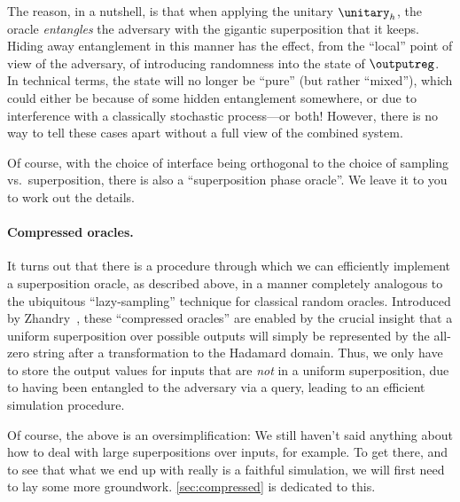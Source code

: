       The reason, in
        a nutshell, is that when applying the unitary $\unitary_h$, the oracle
        \emph{entangles} the adversary with the gigantic superposition that it
        keeps. Hiding away entanglement in this manner has the effect, from the
        ``local'' point of view of the adversary, of introducing randomness
        into the state of $\outputreg$. In technical terms, the state will no
        longer be ``pure'' (but rather ``mixed''), which could
        either be because of some hidden
        entanglement somewhere, or due to interference with a classically stochastic
        process---or both! However, there is no way to tell these cases apart
        without a full view of the combined system.

      Of course, with the choice of interface being orthogonal to the choice of
        sampling vs.\ superposition, there is also a ``superposition phase oracle''.
        We leave it to you to work out the details.

    \paragraph{Compressed oracles.}
      It turns out that there is a procedure through which we can efficiently
        implement a superposition oracle, as described above, in a manner
        completely analogous to the ubiquitous ``lazy-sampling'' technique for
        classical random oracles. Introduced by Zhandry~\cite{C:Zhandry19},
        these ``compressed oracles'' are enabled by the crucial insight that
        a uniform superposition over possible outputs will simply be
        represented by the all-zero string after a transformation to the
        Hadamard domain. Thus, we only have to store the output values for
        inputs that are \emph{not} in a uniform superposition, due to having
        been entangled to the adversary via a query, leading to an efficient
        simulation procedure.

      Of course, the above is an oversimplification: We still haven't said
        anything about how to deal with large superpositions over inputs, for
        example. To get there, and to see that what we end up with really is a
        faithful simulation, we will first need to lay some more groundwork. 
        \autoref{sec:compressed} is dedicated to this.
        
